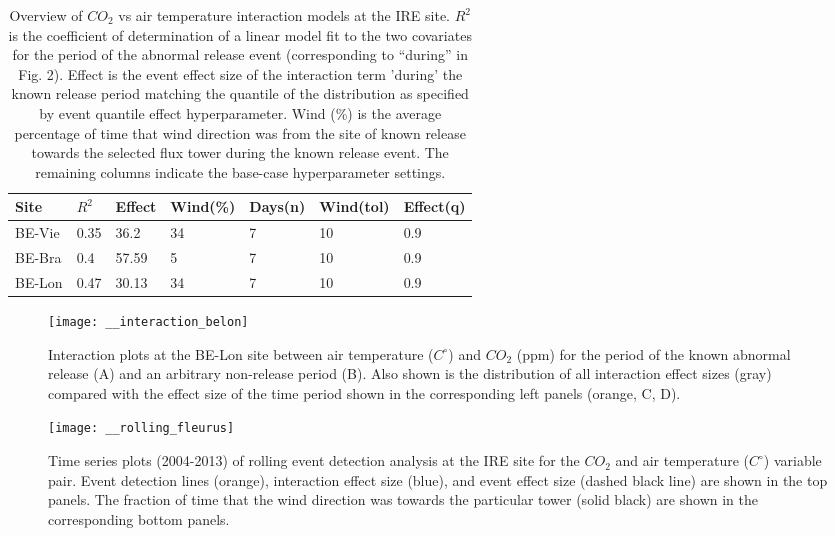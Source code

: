 \documentclass{article}
\begin{document}
\begin{table}[]
	\centering
	\caption{Overview of $CO_2$ vs air temperature interaction models at the IRE site. $R^2$ is the coefficient of determination of a linear model fit to the two covariates for the period of the abnormal release event (corresponding to “during” in Fig. 2). Effect is the event effect size of the interaction term 'during' the known release period matching the quantile of the distribution as specified by event quantile effect hyperparameter. Wind (\%) is the average percentage of time that wind direction was from the site of known release towards the selected flux tower during the known release event. The remaining columns indicate the base-case hyperparameter settings.}
	\begin{tabular}{@{}lllllll@{}}
	\toprule
	Site & $R^2$ & Effect & Wind(\%) & Days(n) & Wind(tol) & Effect(q) \\ \midrule
	BE-Vie & 0.35 & 36.2  & 34 & 7 & 10 & 0.9  \\
	BE-Bra & 0.4 & 57.59  & 5 & 7 & 10 & 0.9 \\
	BE-Lon & 0.47 & 30.13 & 34 & 7 & 10 & 0.9 \\ \bottomrule
	\end{tabular}	
	\label{table:1}
	\end{table}

\begin{figure}
	\centering
	\texttt{[image: \_\_interaction\_belon]}
	\caption{Interaction plots at the BE-Lon site between air temperature ($C^{\circ}$) and $CO_2$ (ppm) for the period of the known abnormal release (A) and an arbitrary non-release period (B). Also shown is the distribution of all interaction effect sizes (gray) compared with the effect size of the time period shown in the corresponding left panels (orange, C, D).}
	\label{fig:interaction}
\end{figure}


\begin{figure}
	\centering
	\texttt{[image: \_\_rolling\_fleurus]}
	\caption{Time series plots (2004-2013) of rolling event detection analysis at the IRE site for the $CO_2$ and air temperature ($C^{\circ}$) variable pair. Event detection lines (orange), interaction effect size (blue), and event effect size (dashed black line) are shown in the top panels. The fraction of time that the wind direction was towards the particular tower (solid black) are shown in the corresponding bottom panels.}
	\label{fig:rolling}
\end{figure}
\end{document}
